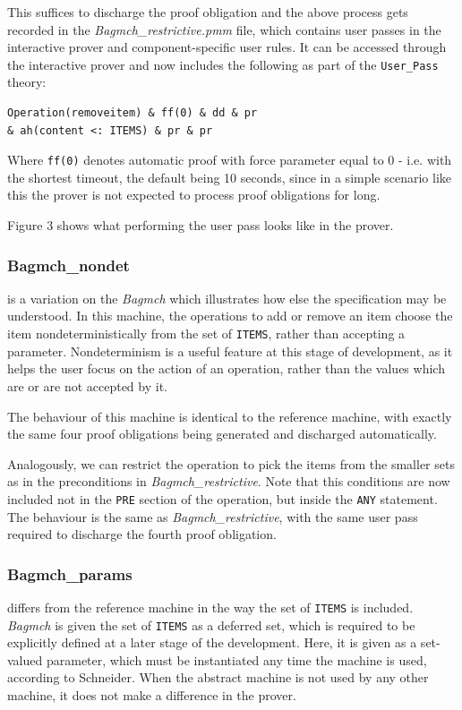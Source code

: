 \documentclass[12pt,journal,duplex]{IEEEtran}
\begin{document}
	This suffices to discharge the proof obligation and the above process gets recorded in the \emph{Bagmch\_restrictive.pmm} file, which contains user passes in the interactive prover and component-specific user rules. It can be accessed through the interactive prover and now includes the following as part of the \texttt{User\_Pass} theory:

	\begin{lstlisting}
Operation(removeitem) & ff(0) & dd & pr
& ah(content <: ITEMS) & pr & pr
	\end{lstlisting}
	Where \texttt{ff(0)} denotes automatic proof with force parameter equal to 0 - i.e. with the shortest timeout, the default being 10 seconds, since in a simple scenario like this the prover is not expected to process proof obligations for long.

	Figure 3 shows what performing the user pass looks like in the prover.

	\subsubsection{Bagmch\_nondet} is a variation on the \emph{Bagmch} which illustrates how else the specification may be understood. In this machine, the operations to add or remove an item choose the item nondeterministically from the set of \texttt{ITEMS}, rather than accepting a parameter. Nondeterminism is a useful feature at this stage of development, as it helps the user focus on the action of an operation, rather than the values which are or are not accepted by it.

	The behaviour of this machine is identical to the reference machine, with exactly the same four proof obligations being generated and discharged automatically.

	Analogously, we can restrict the operation to pick the items from the smaller sets as in the preconditions in \emph{Bagmch\_restrictive}. Note that this conditions are now included not in the \texttt{PRE} section of the operation, but inside the \texttt{ANY} statement. The behaviour is the same as \emph{Bagmch\_restrictive}, with the same user pass required to discharge the fourth proof obligation.

	\subsubsection{Bagmch\_params} differs from the reference machine in the way the set of \texttt{ITEMS} is included. \emph{Bagmch} is given the set of \texttt{ITEMS} as a deferred set, which is required to be explicitly defined at a later stage of the development. Here, it is given as a set-valued parameter, which must be instantiated any time the machine is used, according to Schneider. When the abstract machine is not used by any other machine, it does not make a difference in the prover.
\end{document}
